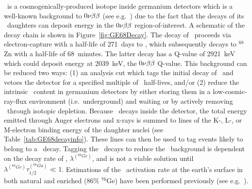        \gersixeight~is a cosmogenically-produced isotope inside germanium detectors which is a well-known background to $0 \nu \beta \beta$ (see e.g.~\cite{Ceb06aa}) due to the fact that the decays of its \galsixeight~daughters can deposit energy in the $0 \nu \beta \beta$ region-of-interest.  A schematic of the decay chain is shown in Figure~\ref{fig:GE68Decay}.  The decay of \gersixeight~proceeds via electron-capture with a half-life of 271~days to \galsixeight, which subsequently decays to $^{68}$Zn with a half-life of 68~minutes.  The latter decay has a Q-value of 2921~keV which could deposit energy at 2039~keV, the $0 \nu \beta \beta$ Q-value.  This background can be reduced two ways: (1) an analysis cut which tags the initial decay of \gersixeight~and vetoes the detector for a specified multiple of \galsixeight~half-lives, and/or (2) reduce the intrinsic \gersixeight~content in germanium detectors by either storing them in a low-cosmic-ray-flux environment (i.e.~underground) and waiting or by actively removing \gersixeight~through isotopic depletion.  Because \gersixeight~decays inside the detector, the total energy emitted through Auger electrons and x-rays is summed to lines of the K-, L-, or M-electron binding energy of the daughter nuclei (see Table~\ref{tab:GE68decayinfo}).  These lines can then be used to tag events likely to belong to a \gersixeight~decay.  Tagging the \gersixeight~decays to reduce the \galsixeight~background is dependent on the decay rate of \gersixeight, $\lambda^{(^{68}Ge)}$, and is not a viable solution until $\lambda^{(^{68}Ge)} \tau_{1/2}^{(^{68}Ga)} \ll 1$.   Estimations of the \gersixeight~activation rate at the earth's surface in both natural and enriched (86\% $^{76}$Ge) have been performed previously (see e.g.~\cite{Avi92,Elliott:2009cw,Mei2009417}). 

